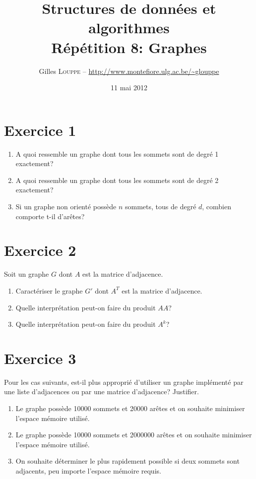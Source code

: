 \documentclass[a4paper,10pt]{article}
\title{
    \textbf{Structures de données et algorithmes}\\
    Répétition 8: Graphes
}
\author{Gilles \textsc{Louppe} -- \url{http://www.montefiore.ulg.ac.be/~glouppe}}
\date{11 mai 2012}
\begin{document}
\maketitle

\section*{Exercice 1}

\begin{enumerate}
\item A quoi ressemble un graphe dont tous les sommets sont de degré 1 exactement?
\item A quoi ressemble un graphe dont tous les sommets sont de degré 2 exactement?
\item Si un graphe non orienté possède $n$ sommets, tous de degré $d$, combien comporte t-il d'arêtes?
\end{enumerate}

\section*{Exercice 2}

Soit un graphe $G$ dont $A$ est la matrice d'adjacence.

\begin{enumerate}
\item Caractériser le graphe $G'$ dont $A^T$ est la matrice d'adjacence.
\item Quelle interprétation peut-on faire du produit $AA$?
\item Quelle interprétation peut-on faire du produit $A^k$?
\end{enumerate}

\section*{Exercice 3}

Pour les cas suivants, est-il plus approprié d'utiliser un graphe implémenté par une liste d'adjacences ou par une matrice d'adjacence? Justifier.

\begin{enumerate}
\item Le graphe possède 10000 sommets et 20000 arêtes et on souhaite minimiser l'espace mémoire utilisé.
\item Le graphe possède 10000 sommets et 2000000 arêtes et on souhaite minimiser l'espace mémoire utilisé.
\item On souhaite déterminer le plus rapidement possible si deux sommets sont adjacents, peu importe l'espace mémoire requis.
\end{enumerate}
\end{document}

